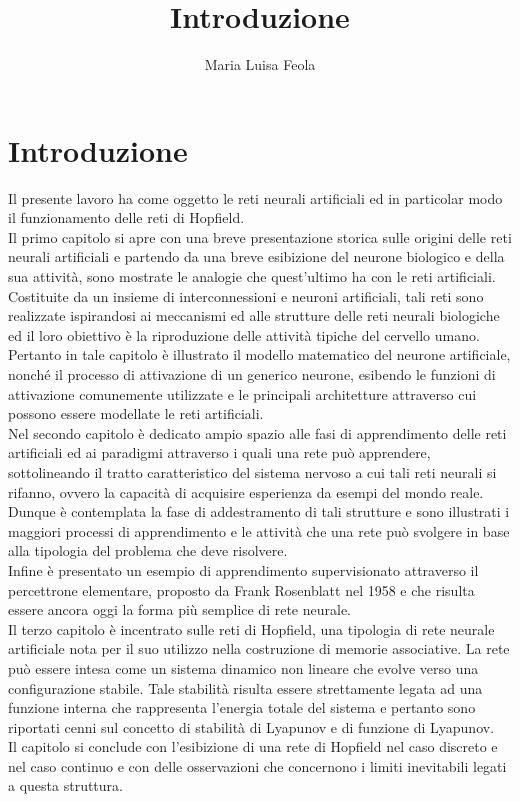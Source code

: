 \documentclass[12pt,a4paper,oneside]{book}
\author{Maria Luisa Feola}
\title{Introduzione}
\begin{document}
\chapter*{Introduzione}

Il presente lavoro ha come oggetto le reti neurali artificiali ed in particolar modo il funzionamento delle reti di Hopfield.\\
Il primo capitolo si apre con una breve presentazione storica sulle origini delle reti neurali artificiali e partendo da una breve esibizione del neurone biologico e della sua attività, sono mostrate le analogie che quest'ultimo ha con le reti artificiali. \\
Costituite da un insieme di interconnessioni e neuroni artificiali, tali reti sono realizzate ispirandosi ai meccanismi ed alle strutture delle reti neurali biologiche ed il loro obiettivo è la riproduzione delle attività tipiche del cervello umano. Pertanto in tale capitolo è illustrato il modello matematico del neurone artificiale, nonché il processo di attivazione di un generico neurone, esibendo le funzioni di attivazione comunemente utilizzate e le principali architetture attraverso cui possono essere modellate le reti artificiali.\\
Nel secondo capitolo è dedicato ampio spazio alle fasi di apprendimento delle reti artificiali ed ai paradigmi attraverso i quali una rete può apprendere, sottolineando il tratto caratteristico del sistema nervoso a cui tali reti neurali si rifanno, ovvero la capacità di acquisire esperienza da esempi del mondo reale. Dunque è contemplata la fase di addestramento di tali strutture e sono illustrati i maggiori processi di apprendimento e le attività che una rete può svolgere in base alla tipologia del problema che deve risolvere.\\
Infine è presentato un esempio di apprendimento supervisionato attraverso il percettrone elementare, proposto da Frank Rosenblatt nel 1958 e che risulta essere ancora oggi la forma più semplice di rete neurale.\\
Il terzo capitolo è incentrato sulle reti di Hopfield, una tipologia di rete neurale artificiale nota per il suo utilizzo nella costruzione di memorie associative. La rete può essere intesa come un sistema dinamico non lineare che evolve verso una configurazione stabile. Tale stabilità risulta essere strettamente legata ad una funzione interna che rappresenta l'energia totale del sistema e pertanto sono riportati cenni sul concetto di stabilità di Lyapunov e di funzione di Lyapunov.\\
Il capitolo si conclude con l'esibizione di una rete di Hopfield nel caso discreto e nel caso continuo e con delle osservazioni che concernono i limiti inevitabili legati a questa struttura.
\end{document}
